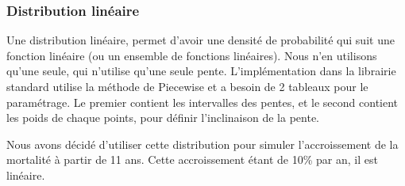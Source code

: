 \documentclass[11pt,a4paper]{article}
\begin{document}
        \subsubsection{Distribution linéaire}
            Une distribution linéaire, permet d'avoir une densité de probabilité qui suit une fonction linéaire 
            (ou un ensemble de fonctions linéaires). Nous n'en utilisons qu'une seule, qui n'utilise qu'une seule pente.
            L'implémentation dans la librairie standard utilise la méthode de Piecewise et a besoin de 2 tableaux pour le paramétrage.
            Le premier contient les intervalles des pentes, et le second contient les poids de chaque points, pour définir l'inclinaison de la pente.
            \par
            Nous avons décidé d'utiliser cette distribution pour simuler l'accroissement de la mortalité à partir de 11 ans. Cette accroissement étant de 10\% par an, il est linéaire.
            \begin{mdframed}[backgroundcolor=light-gray, roundcorner=20pt, innerleftmargin=20, innertopmargin=1, innerbottommargin=1, outerlinewidth=1, linecolor=darkgray]
                
            \end{mdframed}
            \begin{mdframed}[backgroundcolor=light-gray, roundcorner=20pt, innerleftmargin=20, innertopmargin=1, innerbottommargin=1, outerlinewidth=1, linecolor=darkgray]
                
            \end{mdframed}
            \begin{mdframed}[backgroundcolor=light-gray, roundcorner=20pt, innerleftmargin=20, innertopmargin=1, innerbottommargin=1, outerlinewidth=1, linecolor=darkgray]
                
            \end{mdframed}
            \begin{mdframed}[backgroundcolor=light-gray, roundcorner=20pt, innerleftmargin=20, innertopmargin=1, innerbottommargin=1, outerlinewidth=1, linecolor=darkgray]
                
            \end{mdframed}
\end{document}
